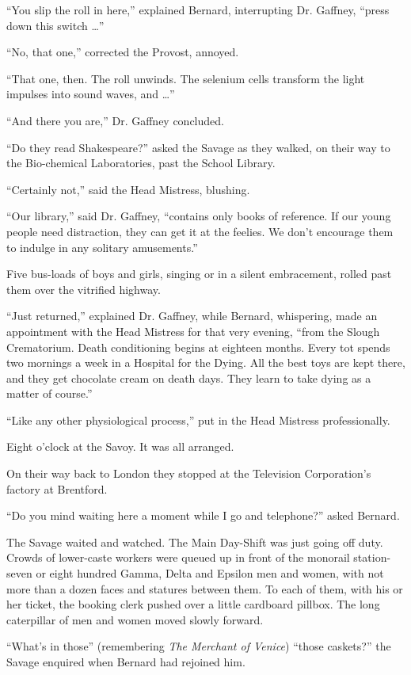 \documentclass[12pt]{report}
\begin{document}
``You slip the roll in here,'' explained Bernard, interrupting Dr.
Gaffney, ``press down this switch \ldots{}''

``No, that one,'' corrected the Provost, annoyed.

``That one, then. The roll unwinds. The selenium cells transform the
light impulses into sound waves, and \ldots{}''

``And there you are,'' Dr. Gaffney concluded.

``Do they read Shakespeare?'' asked the Savage as they walked, on their
way to the Bio-chemical Laboratories, past the School Library.

``Certainly not,'' said the Head Mistress, blushing.

``Our library,'' said Dr. Gaffney, ``contains only books of reference.
If our young people need distraction, they can get it at the feelies. We
don't encourage them to indulge in any solitary amusements.''

Five bus-loads of boys and girls, singing or in a silent embracement,
rolled past them over the vitrified highway.

``Just returned,'' explained Dr. Gaffney, while Bernard, whispering,
made an appointment with the Head Mistress for that very evening, ``from
the Slough Crematorium. Death conditioning begins at eighteen months.
Every tot spends two mornings a week in a Hospital for the Dying. All
the best toys are kept there, and they get chocolate cream on death
days. They learn to take dying as a matter of course.''

``Like any other physiological process,'' put in the Head Mistress
professionally.

Eight o'clock at the Savoy. It was all arranged.

On their way back to London they stopped at the Television Corporation's
factory at Brentford.

``Do you mind waiting here a moment while I go and telephone?'' asked
Bernard.

The Savage waited and watched. The Main Day-Shift was just going off
duty. Crowds of lower-caste workers were queued up in front of the
monorail station-seven or eight hundred Gamma, Delta and Epsilon men and
women, with not more than a dozen faces and statures between them. To
each of them, with his or her ticket, the booking clerk pushed over a
little cardboard pillbox. The long caterpillar of men and women moved
slowly forward.

``What's in those'' (remembering \emph{The Merchant of Venice}) ``those
caskets?'' the Savage enquired when Bernard had rejoined him.
\end{document}
